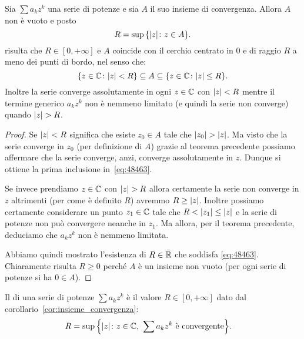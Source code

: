 \begin{corollary}%
\mymark{**}
\label{cor:insieme_convergenza}%
Sia $\sum a_k z^k$ una serie di potenze e sia $A$ il suo insieme di convergenza.
Allora $A$ non è vuoto e posto
\[
  R= \sup {\left\{ {\left|z\right|}\colon z\in A \right\}}.
\]
risulta che $R\in[0,+\infty]$ e $A$ coincide con il cerchio centrato in $0$
e di raggio $R$ a meno dei punti di bordo, nel senso che:
\begin{equation}\label{eq:48463}
   {\left\{ z\in {\mathbb C}\colon {\left|z\right|} < R \right\}}
   \subseteq A
   \subseteq {\left\{ z\in {\mathbb C}\colon {\left|z\right|}\le R \right\}}.
\end{equation}
Inoltre la serie converge assolutamente in ogni $z\in {\mathbb C}$ con ${\left|z\right|}<R$
mentre
il termine generico $a_k z^k$ non è nemmeno limitato (e quindi la serie non converge)
quando ${\left|z\right|}>R$.
\end{corollary}
%
\begin{proof}
Se ${\left|z\right|}<R$ significa che esiste $z_0\in A$ tale che ${\left|z_0\right|} > {\left|z\right|}$.
Ma visto che la serie converge in $z_0$ (per definizione di $A$) grazie al teorema
precedente possiamo affermare che la serie converge, anzi, converge assolutamente
in $z$. Dunque si ottiene la prima inclusione in~\eqref{eq:48463}.

Se invece prendiamo $z\in {\mathbb C}$ con ${\left|z\right|}>R$ allora
certamente la serie non converge in $z$ altrimenti (per come è definito $R$)
avremmo $R\ge {\left|z\right|}$.
Inoltre possiamo certamente considerare un punto $z_1\in{\mathbb C}$
tale che $R < {\left|z_1\right|} \le {\left|z\right|}$ e la serie
di potenze non può convergere neanche in $z_1$.
Ma allora, per il teorema precedente,
deduciamo che $a_k z^k$ non è nemmeno limitata.

Abbiamo quindi mostrato l'esistenza di $R\in \bar {{\mathbb R}}$ che soddisfa \eqref{eq:48463}.
Chiaramente risulta $R\ge 0$ perché $A$ è un insieme non vuoto
(per ogni serie di potenze si ha $0\in A$).
\end{proof}

\begin{definition}
\mymark{**}
Il  di una serie di potenze $\sum a_k z^k$
è il valore $R\in[0,+\infty]$
dato dal corollario~\ref{cor:insieme_convergenza}:
\begin{align*}
  R &= \sup {\left\{ {\left|z\right|}\colon z\in {\mathbb C},\ \sum a_k z^k \text{ è convergente} \right\}}.
\end{align*}
\end{definition}

